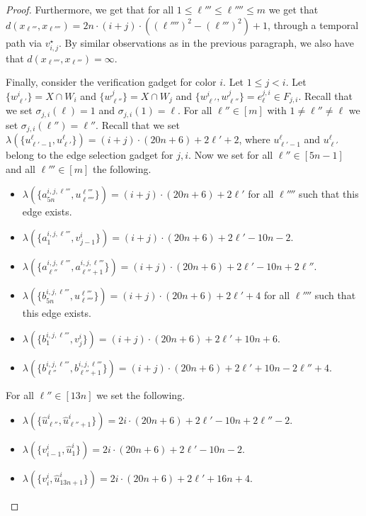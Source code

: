 \documentclass[a4paper,UKenglish,cleveref, autoref, thm-restate]{lipics-v2021}
\begin{document}
\begin{proof}
 Furthermore, we get that for all $1\le \ell'''\le\ell''''\le m$ we get that $d(x_{\ell'''},x_{\ell''''})=2n\cdot (i+j)\cdot((\ell'''')^2-(\ell''')^2)+1$, through a temporal path via $v_{i,j}^\star$.
By similar observations as in the previous paragraph, we also have that $d(x_{\ell''''},x_{\ell'''})=\infty$.

Finally, consider the verification gadget for color $i$. 
Let $1\le j<i$. 
Let $\{w^i_{\ell'}\}=X\cap W_i$ and $\{w^j_{\ell''}\}=X\cap W_j$ and $\{w^i_{\ell'},w^j_{\ell''}\}=e^{j,i}_\ell\in F_{j,i}$. 
Recall that we set $\sigma_{j,i}(\ell)=1$ and $\sigma_{j,i}(1)=\ell$. For all $\ell''\in[m]$ with $1\neq\ell''\neq\ell$ we set $\sigma_{j,i}(\ell'')=\ell''$.
Recall that we set $\lambda(\{u^{\ell}_{\ell'-1},u^{\ell}_{\ell'}\})=(i+j)\cdot (20n+6)+2\ell'+2$, where $u^{\ell}_{\ell'-1}$ and $u^{\ell}_{\ell'}$ belong to the edge selection gadget for $j,i$.
Now we set for all $\ell''\in[5n-1]$ and all $\ell'''\in[m]$ the following.
\begin{itemize}
    \item $\lambda(\{a^{i,j,\ell'''}_{5n},u^{\ell'''}_{\ell''''}\})=(i+j)\cdot (20n+6)+2\ell'$ for all $\ell''''$ such that this edge exists.
    \item $\lambda(\{a^{i,j,\ell'''}_{1},v^i_{j-1}\})=(i+j)\cdot (20n+6)+2\ell'-10n-2$.
    \item $\lambda(\{a^{i,j,\ell'''}_{\ell''},a^{i,j,\ell'''}_{\ell''+1}\})=(i+j)\cdot (20n+6)+2\ell'-10n+2\ell''$.
    \item $\lambda(\{b^{i,j,\ell'''}_{5n},u^{\ell'''}_{\ell''''}\})=(i+j)\cdot (20n+6)+2\ell'+4$ for all $\ell''''$ such that this edge exists.
    \item $\lambda(\{b^{i,j,\ell'''}_{1},v^i_{j}\})=(i+j)\cdot (20n+6)+2\ell'+10n+6$.
    \item $\lambda(\{b^{i,j,\ell'''}_{\ell''},b^{i,j,\ell'''}_{\ell''+1}\})=(i+j)\cdot (20n+6)+2\ell'+10n-2\ell''+4$.
\end{itemize}
For all $\ell''\in[13n]$ we set the following.
\begin{itemize}
    \item $\lambda(\{\hat{u}^i_{\ell''},\hat{u}^i_{\ell''+1}\})=2i\cdot (20n+6)+2\ell'-10n+2\ell''-2$.
    \item $\lambda(\{v^i_{i-1},\hat{u}^i_{1}\})=2i\cdot (20n+6)+2\ell'-10n-2$.
    \item $\lambda(\{v^i_i,\hat{u}^i_{13n+1}\})=2i\cdot (20n+6)+2\ell'+16n+4$.
\end{itemize}

\end{proof}
\end{document}
